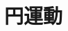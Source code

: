 \documentclass[../../all/physics-standard_answers_all.tex]{subfiles}
\begin{document}
\section{円運動}
\end{document}
